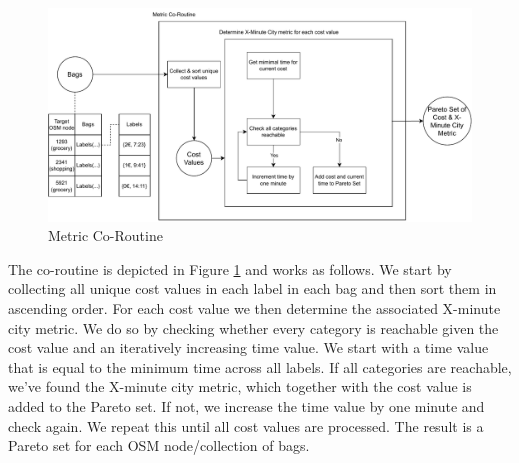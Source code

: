 \begin{figure}
    \centering
    \includegraphics[scale=0.75]{Figures/method/metric_coroutine}
    \caption{Metric Co-Routine}
    \label{fig:metric_co_routine}
\end{figure}
The co-routine is depicted in Figure \ref{fig:metric_co_routine} and works as follows.
We start by collecting all unique cost values in each label in each bag and then sort them in ascending order.
For each cost value we then determine the associated X-minute city metric.
We do so by checking whether every category is reachable given the cost value and an iteratively increasing time value.
We start with a time value that is equal to the minimum time across all labels.
If all categories are reachable, we've found the X-minute city metric, which together with the cost value is added to the Pareto set.
If not, we increase the time value by one minute and check again.
We repeat this until all cost values are processed.
The result is a Pareto set for each OSM node/collection of bags.
